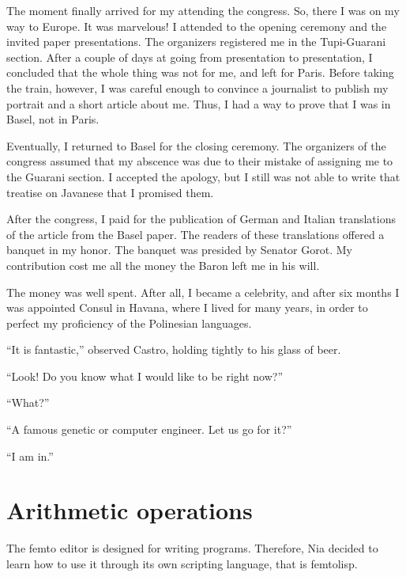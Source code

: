 \documentclass[a4paper,12pt]{book}
\begin{document}
The moment finally arrived for my
attending the congress. So, there
I was on my way to Europe.
It was marvelous! I attended to
the opening ceremony and the invited
paper presentations. The organizers
registered me in the Tupi-Guarani
section. After a couple of days at
going from presentation to presentation,
I concluded that the whole thing was
not for me, and left for Paris.
Before taking the train, however,
I was careful enough to convince a
journalist to publish my portrait
and a short article about me. Thus,
I had a way to prove that I was in
Basel, not in Paris.

Eventually, I returned to Basel for
the closing ceremony. The organizers
of the congress assumed that my
abscence was due to their mistake
of assigning me to the Guarani section.
I accepted the apology, but I still
was not able to write that treatise
on Javanese that I promised them.

After the congress, I paid for the publication
of German and Italian translations of the article
from the Basel paper. The readers of these
translations offered a banquet in my honor.
The banquet was presided by Senator Gorot.
My contribution cost me all the money
the Baron left me in his will.

The money was well spent. After all,
I became a celebrity, and after six
months I was appointed Consul in
Havana, where I lived for many years,
in order to perfect my proficiency
of the Polinesian languages.

``It is fantastic,'' observed Castro, holding
tightly to his glass of beer.

``Look! Do you know what I would like to
be right now?''

``What?''

``A famous genetic or computer engineer. Let us
go for it?''

``I am in.''


\chapter{Arithmetic operations}
The femto editor is designed for writing programs.
Therefore, Nia decided
to learn how to use it through its own scripting language,
that is femtolisp.
\end{document}
